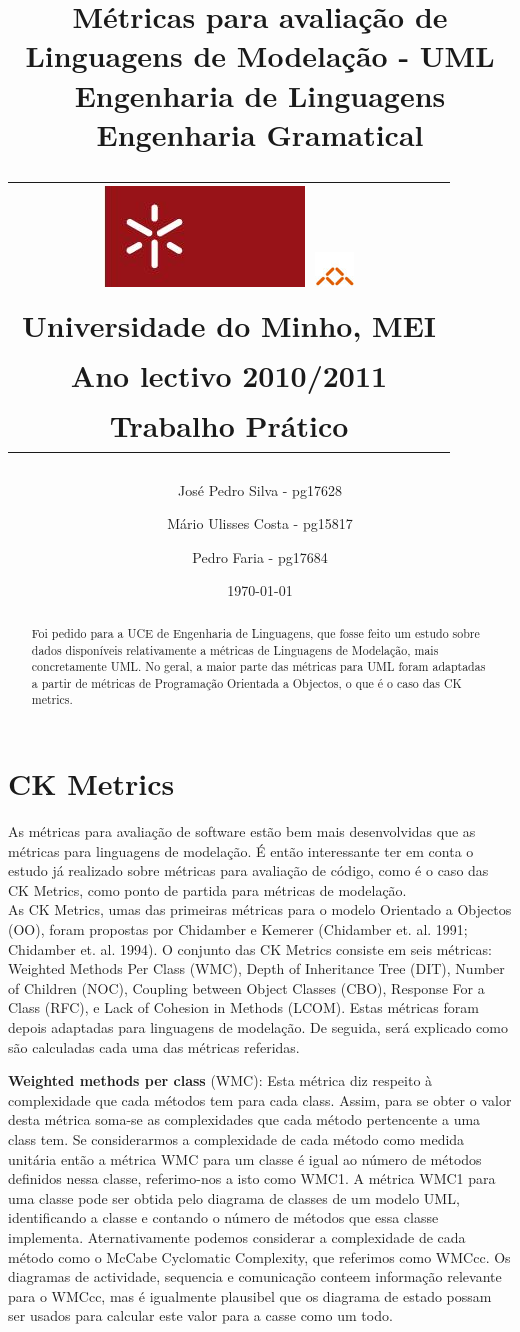 \documentclass[11pt,a4paper,notitlepage]{article}
\title{\sf  Métricas para avaliação de Linguagens de Modelação - UML \\ Engenharia de Linguagens \\ Engenharia Gramatical \\
\begin{tabular}{c}
    \includegraphics[width=.1\textwidth]{stuff/uminho.jpg}
    \includegraphics[width=.07\textwidth]{stuff/informatica.jpg}\\
    {\small Universidade do Minho}, {\small MEI}\\
    {\small Ano lectivo 2010/2011}\\
    {\small Trabalho Prático}\\
\end{tabular}
}
\author{
    {\small José Pedro Silva - pg17628} \and
    {\small Mário Ulisses Costa - pg15817} \and
    {\small Pedro Faria - pg17684}}
\date{{\small \today}}
\begin{document}
\maketitle


\begin{abstract}
Foi pedido para a UCE de Engenharia de Linguagens, que fosse feito um estudo sobre dados disponíveis relativamente a 
métricas de Linguagens de Modelação, mais concretamente UML. No geral, a maior parte das métricas para UML foram adaptadas a partir
de métricas de Programação Orientada a Objectos, o que é o caso das CK metrics.
\end{abstract}


\section{CK Metrics}
As métricas para avaliação de  software estão bem mais desenvolvidas que as métricas para linguagens de modelação. É então interessante ter em conta o estudo já realizado sobre métricas para avaliação de código, como é o caso das CK Metrics, como ponto de partida para métricas de modelação.\\
As CK Metrics, umas das primeiras métricas para o modelo Orientado a Objectos (OO), foram propostas por Chidamber e  Kemerer (Chidamber et. al. 1991; Chidamber et. al. 1994). O conjunto das CK Metrics consiste em seis métricas: Weighted Methods Per Class (WMC), Depth of Inheritance Tree (DIT), Number of Children (NOC), Coupling between Object Classes (CBO), Response For a Class (RFC), e Lack of Cohesion in Methods (LCOM). Estas métricas foram depois adaptadas para linguagens de modelação. De seguida, será explicado como são calculadas cada uma das métricas referidas.


\textbf{Weighted methods per class} (WMC):
Esta métrica diz respeito à complexidade que cada métodos tem para cada class. Assim, para se obter o valor desta métrica soma-se
as complexidades que cada método pertencente a uma class tem. Se considerarmos a complexidade de cada método como medida unitária
então a métrica WMC para um classe é igual ao número de métodos definidos nessa classe, referimo-nos a isto como WMC1.
A métrica WMC1 para uma classe pode ser obtida pelo diagrama de classes de um modelo UML, identificando a classe e contando o número
de métodos que essa classe implementa. Aternativamente podemos considerar a complexidade de cada método como o McCabe Cyclomatic Complexity, que referimos
como WMCcc. Os diagramas de actividade, sequencia e comunicação conteem informação relevante para o WMCcc, mas é igualmente
plausibel que os diagrama de estado possam ser usados para calcular este valor para a casse como um todo.\\
\end{document}
